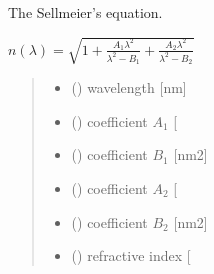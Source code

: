 \documentclass[letterpaper,10pt,english]{sphinxmanual}
\begin{document}
\begin{fulllineitems}
\label{\detokenize{05_refractive_index:skinoptics.refractive_index.n_Sellmeier}}
\pysigstartsignatures
{}
\pysigstopsignatures
\sphinxAtStartPar
The Sellmeier’s equation.

\sphinxAtStartPar
\(n(\lambda) = \sqrt{1 + \frac{A_1\lambda^2}{\lambda^2 - B_1} + \frac{A_2\lambda^2}{\lambda^2 - B_2}}\)
\begin{quote}\begin{description}
\begin{itemize}
\item {} 
\sphinxAtStartPar
{} () \textendash{} wavelength {[}nm{]}

\item {} 
\sphinxAtStartPar
{} () \textendash{} coefficient \(A_1\) {[}\sphinxhyphen{}{]}

\item {} 
\sphinxAtStartPar
{} () \textendash{} coefficient \(B_1\) {[}nm2{]}

\item {} 
\sphinxAtStartPar
{} () \textendash{} coefficient \(A_2\) {[}\sphinxhyphen{}{]}

\item {} 
\sphinxAtStartPar
{} () \textendash{} coefficient \(B_2\) {[}nm2{]}

\end{itemize}

\sphinxAtStartPar
\begin{itemize}
\item {} 
\sphinxAtStartPar
{} () \textendash{} refractive index {[}\sphinxhyphen{}{]}

\end{itemize}


\end{description}\end{quote}

\end{fulllineitems}
\end{document}
